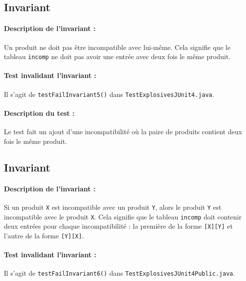 \documentclass{article}
\begin{document}
\subsection{Invariant }

\paragraph{Description de l'invariant :} Un produit ne doit pas être incompatible avec lui-même. Cela signifie que le tableau \texttt{incomp} ne doit pas avoir une entrée avec deux fois le même produit.

\vspace{-0.2cm}
\paragraph{Test invalidant l'invariant :} Il s'agit de \texttt{testFailInvariant5()} dans \texttt{TestExplosivesJUnit4.java}.

\vspace{-0.2cm}
\paragraph{Description du test :} Le test fait un ajout d'une incompatibilité où la paire de produits contient deux fois le même produit.

\subsection{Invariant }

\paragraph{Description de l'invariant :} Si un produit \texttt{X} est incompatible avec un produit \texttt{Y}, alors le produit \texttt{Y} est incompatible avec le produit \texttt{X}. Cela signifie que le tableau \texttt{incomp} doit contenir deux entrées pour chaque incompatibilité : la première de la forme \texttt{[X][Y]} et l'autre de la forme \texttt{[Y][X]}.

\vspace{-0.2cm}
\paragraph{Test invalidant l'invariant :} Il s'agit de \texttt{testFailInvariant6()} dans \texttt{TestExplosivesJUnit4Public.java}.

\vspace{-0.2cm}
\end{document}
